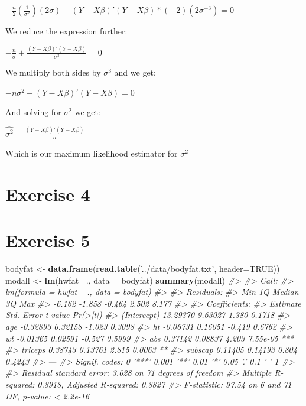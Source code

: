 \documentclass[]{article}
\newenvironment{Shaded}{\begin{snugshade}}{\end{snugshade}}
\newcommand{\CommentTok}[1]{\textcolor[rgb]{0.56,0.35,0.01}{\textit{#1}}}
\newcommand{\DataTypeTok}[1]{\textcolor[rgb]{0.13,0.29,0.53}{#1}}
\newcommand{\KeywordTok}[1]{\textcolor[rgb]{0.13,0.29,0.53}{\textbf{#1}}}
\newcommand{\NormalTok}[1]{#1}
\newcommand{\OperatorTok}[1]{\textcolor[rgb]{0.81,0.36,0.00}{\textbf{#1}}}
\newcommand{\OtherTok}[1]{\textcolor[rgb]{0.56,0.35,0.01}{#1}}
\newcommand{\StringTok}[1]{\textcolor[rgb]{0.31,0.60,0.02}{#1}}
\begin{document}
\(- \frac{n}{2} (\frac{1}{ \sigma^{2}} ) (2 \sigma) - (Y - X \beta) \prime (Y - X \beta) * (-2)(2 \sigma^{-3}) = 0\)

We reduce the expression further:

\(- \frac{n}{\sigma} + \frac{(Y - X \beta) \prime (Y - X \beta)}{\sigma^{3}} = 0\)

We multiply both sides by \(\sigma^{3}\) and we get:

\(- n \sigma^{2} + (Y - X \beta) \prime (Y - X \beta) = 0\)

And solving for \(\sigma^{2}\) we get:

\(\hat{\sigma^{2}} = \frac{(Y - X \beta) \prime (Y - X \beta)}{n}\)

Which is our maximum likelihood estimator for \(\sigma^2\)

\hypertarget{exercise-4}{%
\section{Exercise 4}\label{exercise-4}}

\newpage

\hypertarget{exercise-5}{%
\section{Exercise 5}\label{exercise-5}}

\begin{Shaded}
\begin{Highlighting}[]
\NormalTok{bodyfat <-}\StringTok{ }\KeywordTok{data.frame}\NormalTok{(}\KeywordTok{read.table}\NormalTok{(}\StringTok{'../data/bodyfat.txt'}\NormalTok{, }\DataTypeTok{header=}\OtherTok{TRUE}\NormalTok{))}
\NormalTok{modall <-}\StringTok{ }\KeywordTok{lm}\NormalTok{(hwfat }\OperatorTok{~}\NormalTok{., }\DataTypeTok{data =}\NormalTok{ bodyfat)}
\KeywordTok{summary}\NormalTok{(modall)}
\CommentTok{#> }
\CommentTok{#> Call:}
\CommentTok{#> lm(formula = hwfat ~ ., data = bodyfat)}
\CommentTok{#> }
\CommentTok{#> Residuals:}
\CommentTok{#>    Min     1Q Median     3Q    Max }
\CommentTok{#> -6.162 -1.858 -0.464  2.502  8.177 }
\CommentTok{#> }
\CommentTok{#> Coefficients:}
\CommentTok{#>             Estimate Std. Error t value Pr(>|t|)    }
\CommentTok{#> (Intercept) 13.29370    9.63027   1.380   0.1718    }
\CommentTok{#> age         -0.32893    0.32158  -1.023   0.3098    }
\CommentTok{#> ht          -0.06731    0.16051  -0.419   0.6762    }
\CommentTok{#> wt          -0.01365    0.02591  -0.527   0.5999    }
\CommentTok{#> abs          0.37142    0.08837   4.203 7.55e-05 ***}
\CommentTok{#> triceps      0.38743    0.13761   2.815   0.0063 ** }
\CommentTok{#> subscap      0.11405    0.14193   0.804   0.4243    }
\CommentTok{#> ---}
\CommentTok{#> Signif. codes:  0 '***' 0.001 '**' 0.01 '*' 0.05 '.' 0.1 ' ' 1}
\CommentTok{#> }
\CommentTok{#> Residual standard error: 3.028 on 71 degrees of freedom}
\CommentTok{#> Multiple R-squared:  0.8918, Adjusted R-squared:  0.8827 }
\CommentTok{#> F-statistic: 97.54 on 6 and 71 DF,  p-value: < 2.2e-16}
\end{Highlighting}
\end{Shaded}
\end{document}
